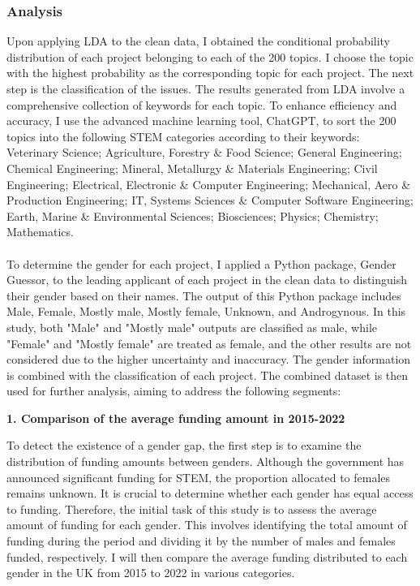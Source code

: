 \subsubsection{Analysis}
\noindent Upon applying LDA to the clean data, I obtained the conditional probability distribution of each project belonging to each of the 200 topics. I choose the topic with the highest probability as the corresponding topic for each project. The next step is the classification of the issues. The results generated from LDA involve a comprehensive collection of keywords for each topic. To enhance efficiency and accuracy, I use the advanced machine learning tool, ChatGPT, to sort the 200 topics into the following STEM categories according to their keywords: Veterinary Science; Agriculture, Forestry \& Food Science; General Engineering; Chemical Engineering; Mineral, Metallurgy \& Materials Engineering; Civil Engineering; Electrical, Electronic \& Computer Engineering; Mechanical, Aero \& Production Engineering; IT, Systems Sciences \& Computer Software Engineering; Earth, Marine \& Environmental Sciences; Biosciences; Physics; Chemistry; Mathematics.\\
\\
To determine the gender for each project, I applied a Python package, Gender Guessor, to the leading applicant of each project in the clean data to distinguish their gender based on their names. The output of this Python package includes Male, Female, Mostly male, Mostly female, Unknown, and Androgynous.  In this study, both "Male" and "Mostly male" outputs are classified as male, while "Female" and "Mostly female" are treated as female, and the other results are not considered due to the higher uncertainty and inaccuracy. The gender information is combined with the classification of each project. The combined dataset is then used for further analysis, aiming to address the following segments:


\textbf{1. Comparison of the average funding amount in 2015-2022}

To detect the existence of a gender gap, the first step is to examine the distribution of funding amounts between genders. Although the government has announced significant funding for STEM, the proportion allocated to females remains unknown. It is crucial to determine whether each gender has equal access to funding. Therefore, the initial task of this study is to assess the average amount of funding for each gender. This involves identifying the total amount of funding during the period and dividing it by the number of males and females funded, respectively. I will then compare the average funding distributed to each gender in the UK from 2015 to 2022 in various categories.

